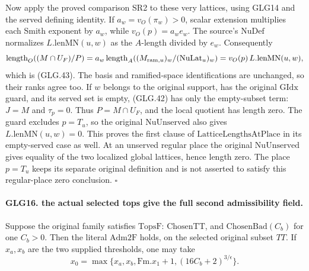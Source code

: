 Now apply the proved comparison SR2 to these very lattices,
using GLG14 and the served defining identity.
If \(a_w=v_O(\pi_w)>0\), scalar extension multiplies each
Smith exponent by \(a_w\), while \(v_O(p)=a_we_w\).
The source's \(\mathrm{NuDef}\) normalizes
\(L.\mathrm{lenMN}(u,w)\) as the \(A\)-length divided
by \(e_w\). Consequently
\[
 \operatorname{length}_O((M\cap U_F)/P)
   =a_w\operatorname{length}_A((M_{{\rm ram},u})_w/
                                             (\mathrm{NuLat}_u)_w)
   =v_O(p)\,L.\mathrm{lenMN}(u,w),
 \]
which is (GLG.43). The basis and ramified-space
identifications are unchanged, so their ranks agree too.
If \(w\) belongs to the original support, has the original
\(\mathrm{GIdx}\) guard, and its served set is empty,
(GLG.42) has only the empty-subset term:
\(J=M\) and \(\tau_p=0\). Thus \(P=M\cap U_F\), and
the local quotient has length zero. The guard excludes
\(p=T_u\), so the original
\(\mathrm{NuUnserved}\) also gives
\(L.\mathrm{lenMN}(u,w)=0\). This proves the first
clause of \(\mathrm{LatticeLengthsAtPlace}\) in its
empty-served case as well.
At an unserved regular place the original
\(\mathrm{NuUnserved}\) gives equality of the two localized
global lattices, hence length zero. The place \(p=T_u\)
keeps its separate original definition and is not
asserted to satisfy this regular-place zero conclusion.
\hfill\(\square\)

\paragraph{GLG16. the actual selected tops give the full second admissibility field.}
\label{claim:GLG16}
Suppose the original family satisfies \(\mathrm{TopsF}\):
\(\mathrm{ChosenTT}\), and \(\mathrm{ChosenBad}(C_b)\)
for one \(C_b>0\). Then the literal \(\mathrm{Adm2F}\)
holds, on the selected original subset \(TT\). If
\(x_a,x_b\) are the two supplied thresholds, one may take
\[
 x_0=\max\{x_a,x_b,\mathrm{Fm}.x_1+1,
                                     (16C_b+2)^{3/\epsilon}\}.    \tag{GLG.45}
\]

